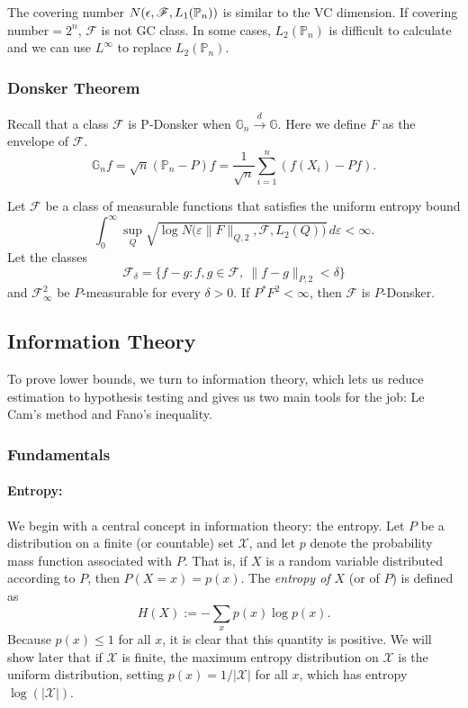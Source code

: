 \begin{rem}
    The covering number $N(\epsilon, \mathcal F, L_1(\mathbb{P}_n))$ is similar to the VC dimension. If covering number$=2^n$, $\mathcal F$ is not GC class. In some cases, $L_2(\mathbb{P}_n)$ is difficult to calculate and we can use $L^{\infty}$ to replace $L_2(\mathbb{P}_n)$.
\end{rem}

\subsubsection{Donsker Theorem}
Recall that a class $\mathcal{F}$ is P-Donsker when $\mathbb{G}_n\xrightarrow{d}\mathbb{G}.$ Here we define $F$ as the envelope of $\mathcal F$.
\[
\mathbb{G}_n f = \sqrt{n}(\mathbb{P}_n - P)f = \frac{1}{\sqrt{n}} \sum_{i=1}^n (f(X_i) - Pf).
\]
\begin{thm}[Donsker]
Let \(\mathcal F\) be a class of measurable functions that satisfies the uniform entropy bound
\[
\int_{0}^{\infty}\sup_{Q}\sqrt{\log N\bigl(\varepsilon \|F\|_{Q,2},\mathcal F,L_2(Q)\bigr)}\,d\varepsilon<\infty.
\]
Let the classes
\[
\mathcal F_\delta=\{f-g:f,g\in\mathcal F,\ \|f-g\|_{P,2}<\delta\}
\]
and \(\mathcal F_\infty^2\) be \(P\)-measurable for every \(\delta>0\). If \(P^{*}F^{2}<\infty\), then \(\mathcal F\) is \(P\)-Donsker.
\end{thm}


\subsection{Information Theory}
To prove lower bounds, we turn to information theory, which lets us reduce estimation to hypothesis testing and gives us two main tools for the job: Le Cam's method and Fano's inequality.

\subsubsection{Fundamentals}
\paragraph{Entropy:} We begin with a central concept in information theory: the entropy. Let $P$ be a distribution on a finite (or countable) set $\mathcal{X}$, and let $p$ denote the probability mass function associated with $P$. That is, if $X$ is a random variable distributed according to $P$, then $P(X = x) = p(x)$. The \emph{entropy of $X$} (or of $P$) is defined as
\begin{equation}
    H(X) := -\sum_{x} p(x) \log p(x).
\end{equation}
Because $p(x) \leq 1$ for all $x$, it is clear that this quantity is positive. We will show later that if $\mathcal{X}$ is finite, the maximum entropy distribution on $\mathcal{X}$ is the uniform distribution, setting $p(x) = 1/|\mathcal{X}|$ for all $x$, which has entropy $\log(|\mathcal{X}|)$.

